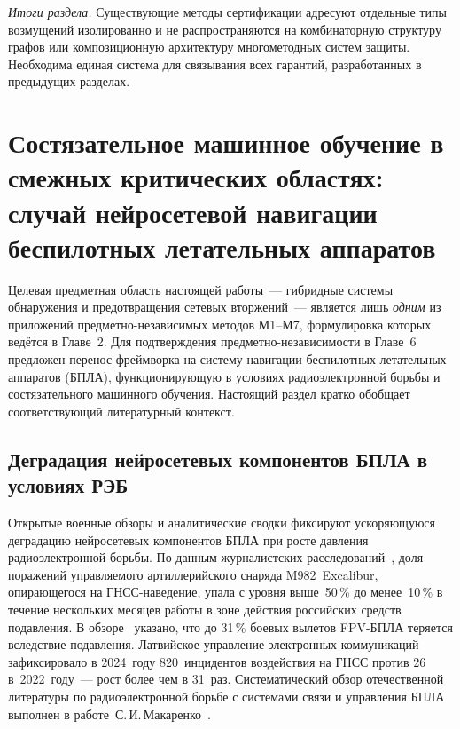 \medskip
\noindent\textit{Итоги раздела.} Существующие методы сертификации адресуют отдельные типы возмущений изолированно и не распространяются на комбинаторную структуру графов или композиционную архитектуру многометодных систем защиты. Необходима единая система для связывания всех гарантий, разработанных в предыдущих разделах.


\section{Состязательное машинное обучение в смежных критических областях:
случай нейросетевой навигации беспилотных летательных аппаратов}
\label{sec:ch1_uav_related}

Целевая предметная область настоящей работы~--- гибридные системы
обнаружения и предотвращения сетевых вторжений~--- является лишь
\emph{одним} из приложений предметно-независимых методов \textsf{М1}--\textsf{М7},
формулировка которых ведётся в Главе~2. Для подтверждения
предметно-независимости в Главе~6 предложен перенос фреймворка
на систему навигации беспилотных летательных аппаратов (БПЛА),
функционирующую в условиях радиоэлектронной борьбы и состязательного
машинного обучения. Настоящий раздел кратко обобщает соответствующий
литературный контекст.

\subsection{Деградация нейросетевых компонентов БПЛА в условиях РЭБ}
Открытые военные обзоры и аналитические сводки фиксируют ускоряющуюся
деградацию нейросетевых компонентов БПЛА при росте давления
радиоэлектронной борьбы. По данным журналистских
расследований~\cite{wapo_excalibur_2024}, доля поражений управляемого
артиллерийского снаряда M982~Excalibur, опирающегося на ГНСС-наведение,
упала с уровня выше~50\,\% до менее~10\,\% в течение нескольких
месяцев работы в зоне действия российских средств подавления.
В обзоре~\cite{inside_uas_2025} указано, что до 31\,\% боевых вылетов
FPV-БПЛА теряется вследствие подавления. Латвийское управление
электронных коммуникаций зафиксировало в 2024~году 820~инцидентов
воздействия на ГНСС против 26 в~2022~году~--- рост более чем в 31~раз.
Систематический обзор отечественной литературы по радиоэлектронной
борьбе с системами связи и управления БПЛА выполнен в
работе~С.\,И.\,Макаренко~\cite{Makarenko2022uav}.

